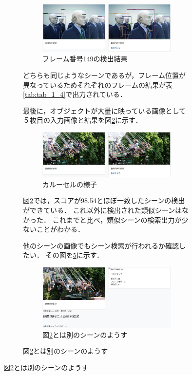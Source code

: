 \documentclass[a4j,12pt,dvipdfmx]{jreport}
\begin{document}
\begin{figure}[H]
\begin{figure}[H]
\begin{figure}[H]
  \centering
  \includegraphics[width=13cm]{image/result_1_4_2.jpg}
  \caption{フレーム番号149の検出結果}
  \label{fig:img_1_4_2}
\end{figure}

どちらも同じようなシーンであるが，フレーム位置が異なっているためそれぞれのフレームの結果が表\ref{tab:tab_1_4}で出力されている．


最後に，オブジェクトが大量に映っている画像として５枚目の入力画像と結果を図\ref{fig:img_1_5}に示す．
\begin{figure}[H]
  \centering
  \includegraphics[width=13cm]{image/result_1_5.jpg}
  \caption{カルーセルの様子}
  \label{fig:img_1_5}
\end{figure}

図\ref{fig:img_1_5}では，スコアが98.54とほぼ一致したシーンの検出ができている．
これ以外に検出された類似シーンはなかった．
これまでと比べ，類似シーンの検索出力が少ないことがわかる．

他のシーンの画像でもシーン検索が行われるか確認したい．
その図を\ref{fig:img_1_5_1}に示す．
\begin{figure}[H]
  \centering
  \includegraphics[width=13cm]{image/result_1_5_1.jpg}
  \caption{図\ref{fig:img_1_5}とは別のシーンのようす}
  \label{fig:img_1_5_1}
\end{figure}


\end{figure}
\end{figure}
\end{document}
